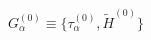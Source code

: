 \begin{equation}
  G_\alpha ^{(0)}\equiv\{\tau_\alpha ^{(0)}, \tilde{H}^{(0)}\}
   \label{a19}
   \end{equation}


